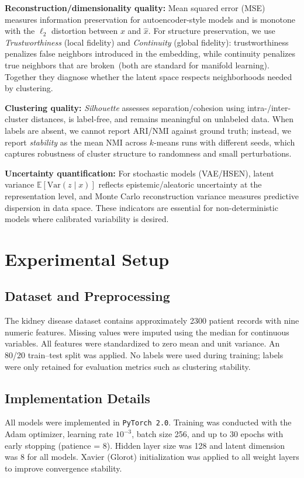 \documentclass[12pt,a4paper]{article}
\begin{document}
\textbf{Reconstruction/dimensionality quality:}
Mean squared error (MSE) measures information preservation for autoencoder-style models and is monotone with the $\ell_2$ distortion between $x$ and $\hat{x}$. 
For structure preservation, we use \emph{Trustworthiness} (local fidelity) and \emph{Continuity} (global fidelity): trustworthiness penalizes false neighbors introduced in the embedding, while continuity penalizes true neighbors that are broken~(both are standard for manifold learning). Together they diagnose whether the latent space respects neighborhoods needed by clustering.

\textbf{Clustering quality:}
\emph{Silhouette} assesses separation/cohesion using intra-/inter-cluster distances, is label-free, and remains meaningful on unlabeled data. 
When labels are absent, we cannot report ARI/NMI against ground truth; instead, we report \emph{stability} as the mean NMI across $k$-means runs with different seeds, which captures robustness of cluster structure to randomness and small perturbations.

\textbf{Uncertainty quantification:}
For stochastic models (VAE/HSEN), latent variance $\mathbb{E}[\mathrm{Var}(z\!\mid\!x)]$ reflects epistemic/aleatoric uncertainty at the representation level, and Monte Carlo reconstruction variance measures predictive dispersion in data space. These indicators are essential for non-deterministic models where calibrated variability is desired.


\section{Experimental Setup}

\subsection{Dataset and Preprocessing}
The kidney disease dataset contains approximately 2300 patient records with nine numeric features. Missing values were imputed using the median for continuous variables. All features were standardized to zero mean and unit variance. An 80/20 train--test split was applied. No labels were used during training; labels were only retained for evaluation metrics such as clustering stability.

\subsection{Implementation Details}
All models were implemented in \texttt{PyTorch 2.0}. Training was conducted with the Adam optimizer, learning rate $10^{-3}$, batch size 256, and up to 30 epochs with early stopping (patience = 8). Hidden layer size was 128 and latent dimension was 8 for all models. Xavier (Glorot) initialization was applied to all weight layers to improve convergence stability.
\end{document}
